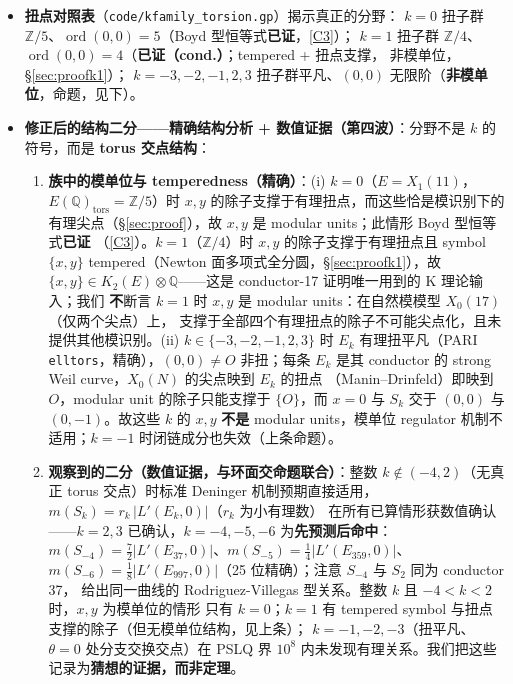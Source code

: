 \documentclass[11pt,a4paper]{ctexart}
\theoremstyle{remark}
\newcommand{\QQ}{\mathbb{Q}}
\newcommand{\ZZ}{\mathbb{Z}}
\begin{document}
\begin{itemize}[nosep]
\begin{enumerate}[nosep]
\item \textbf{数值观察}：自然候选对象（半环 $L_1$，连续根一圈，开链）周期与
$w_{\mathrm{anti}}$ 之比 $0.5492906\ldots$ 在已算精度内未见整数性，regulator 积分与
$2\pi b_{53}$ 之比 $0.7392026\ldots$；系数界 $10^8$ 的 PSLQ 搜索未发现有理关系。
\end{enumerate}
这些不排除经其他途径得到的恒等式；被排除的是证明 \eqref{C3} 的那个特定机制。
在缺乏精确候选公式的情况下，conductor 53 情形\textbf{留作开放}。
\item \textbf{扭点对照表}（\texttt{code/kfamily\_torsion.gp}）揭示真正的分野：
$k=0$ 扭子群 $\ZZ/5$、$\operatorname{ord}(0,0)=5$（Boyd 型恒等式\textbf{已证}，\eqref{C3}）；
$k=1$ 扭子群 $\ZZ/4$、$\operatorname{ord}(0,0)=4$（\textbf{已证（cond.）}；tempered + 扭点支撑，
非模单位，\S\ref{sec:proofk1}）；
$k=-3,-2,-1,2,3$ 扭子群平凡、$(0,0)$ 无限阶（\textbf{非模单位}，命题，见下）。
\item \textbf{修正后的结构二分——精确结构分析 + 数值证据（第四波）}：分野不是 $k$ 的符号，而是
\textbf{torus 交点结构}：
\begin{enumerate}[nosep]
\item \textbf{族中的模单位与 temperedness（精确）}：(i) $k=0$（$E=X_1(11)$，
$E(\QQ)_{\mathrm{tors}}=\ZZ/5$）时 $x,y$ 的除子支撑于有理扭点，而这些恰是模识别下的
有理尖点（\S\ref{sec:proof}），故 $x,y$ 是 modular units；此情形 Boyd 型恒等式\textbf{已证}
（\eqref{C3}）。$k=1$（$\ZZ/4$）时 $x,y$ 的除子支撑于有理扭点且 symbol $\{x,y\}$
tempered（Newton 面多项式全分圆，\S\ref{sec:proofk1}），故
$\{x,y\}\in K_2(E)\otimes\QQ$——这是 conductor-17 证明唯一用到的 K 理论输入；我们
\textbf{不}断言 $k=1$ 时 $x,y$ 是 modular units：在自然模模型 $X_0(17)$（仅两个尖点）上，
支撑于全部四个有理扭点的除子不可能尖点化，且未提供其他模识别。(ii)
$k\in\{-3,-2,-1,2,3\}$ 时 $E_k$ 有理扭平凡（PARI \texttt{elltors}，精确），$(0,0)\ne O$
非扭；每条 $E_k$ 是其 conductor 的 strong Weil curve，$X_0(N)$ 的尖点映到 $E_k$ 的扭点
（Manin--Drinfeld）即映到 $O$，modular unit 的除子只能支撑于 $\{O\}$，而 $x=0$ 与 $S_k$
交于 $(0,0)$ 与 $(0,-1)$。故这些 $k$ 的 $x,y$ \textbf{不是} modular units，模单位 regulator
机制不适用；$k=-1$ 时闭链成分也失效（上条命题）。
\item \textbf{观察到的二分（数值证据，与环面交命题联合）}：整数 $k\notin(-4,2)$（无真正
torus 交点）时标准 Deninger 机制预期直接适用，$m(S_k)=r_k\,|L'(E_k,0)|$（$r_k$ 为小有理数）
在所有已算情形获数值确认——$k=2,3$ 已确认，$k=-4,-5,-6$ 为\textbf{先预测后命中}：
$m(S_{-4})=\frac72|L'(E_{37},0)|$、$m(S_{-5})=\frac14|L'(E_{359},0)|$、
$m(S_{-6})=\frac18|L'(E_{997},0)|$（25 位精确）；注意 $S_{-4}$ 与 $S_2$ 同为 conductor 37，
给出同一曲线的 Rodriguez-Villegas 型关系。整数 $k$ 且 $-4<k<2$ 时，$x,y$ 为模单位的情形
只有 $k=0$；$k=1$ 有 tempered symbol 与扭点支撑的除子（但无模单位结构，见上条）；
$k=-1,-2,-3$（扭平凡、$\theta=0$ 处分支交换交点）在 PSLQ 界
$10^8$ 内未发现有理关系。我们把这些记录为\textbf{猜想的证据，而非定理}。
\end{enumerate}
\end{itemize}
\end{document}
